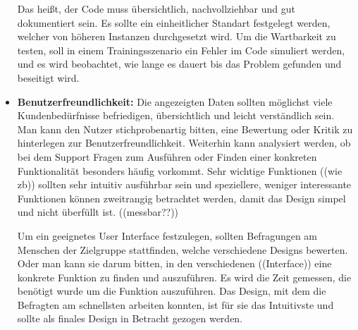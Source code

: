 \begin{itemize}
    Das heißt, der Code muss übersichtlich, nachvollziehbar und gut dokumentiert sein. 
    Es sollte ein einheitlicher Standart festgelegt werden, welcher von höheren Instanzen durchgesetzt wird. 
    Um die Wartbarkeit zu testen, soll in einem Trainingsszenario ein Fehler im Code simuliert werden, 
    und es wird beobachtet, wie lange es dauert bis das Problem gefunden und beseitigt wird. 
    

    \item \textbf{Benutzerfreundlichkeit: }
    Die angezeigten Daten sollten möglichst viele Kundenbedürfnisse 
    befriedigen, übersichtlich und leicht verständlich sein.
    Man kann den Nutzer stichprobenartig bitten, eine Bewertung oder Kritik zu hinterlegen zur Benutzerfreundlichkeit. 
    Weiterhin kann analysiert werden, ob bei dem Support Fragen zum Ausführen oder Finden einer konkreten Funktionalität besonders häufig vorkommt.
    Sehr wichtige Funktionen ((wie zb)) sollten sehr intuitiv ausführbar sein und speziellere, weniger interessante Funktionen können zweitrangig 
    betrachtet werden, damit das Design simpel und nicht überfüllt ist.
    ((messbar??))
    
    Um ein geeignetes User Interface festzulegen, sollten Befragungen am Menschen der Zielgruppe stattfinden,
    welche verschiedene Designs bewerten.
    Oder man kann sie darum bitten, in den verschiedenen ((Interface)) eine konkrete Funktion zu finden und auszuführen.
    Es wird die Zeit gemessen, die benötigt wurde um die Funktion auszuführen.
    Das Design, mit dem die Befragten am schnellsten arbeiten konnten, ist für sie das Intuitivste und sollte als finales Design in Betracht gezogen werden. 
    
   
\end{itemize}
